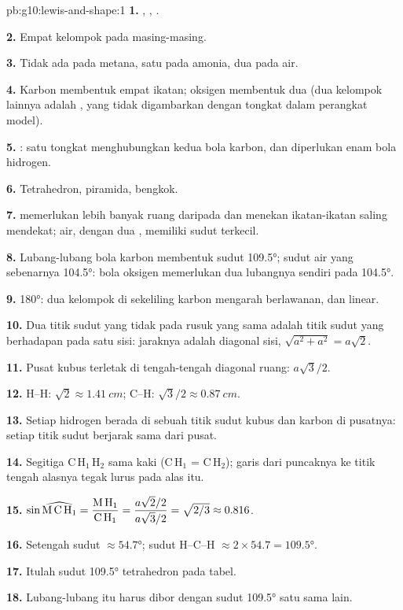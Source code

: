 \begin{solution}{pb:g10:lewis-and-shape:1}
\textbf{1.} , ,
.

\textbf{2.} Empat kelompok pada masing-masing.

\textbf{3.} Tidak ada pada metana, satu pada amonia, dua pada air.

\textbf{4.} Karbon membentuk empat ikatan; oksigen membentuk dua (dua
kelompok lainnya adalah , yang tidak digambarkan dengan
tongkat dalam perangkat model).

\textbf{5.} : satu tongkat
menghubungkan kedua bola karbon, dan diperlukan enam bola hidrogen.

\textbf{6.} Tetrahedron, piramida, bengkok.

\textbf{7.}  memerlukan lebih banyak ruang daripada
 dan menekan ikatan-ikatan saling mendekat; air, dengan
dua , memiliki sudut terkecil.

\textbf{8.} Lubang-lubang bola karbon membentuk sudut \ang{109.5}; sudut
air yang sebenarnya \ang{104.5}: bola oksigen memerlukan dua lubangnya
sendiri pada \ang{104.5}.

\textbf{9.} \ang{180}: dua kelompok di sekeliling karbon mengarah
berlawanan, dan  linear.

\textbf{10.} Dua titik sudut yang tidak pada rusuk yang sama adalah titik
sudut yang berhadapan pada satu sisi: jaraknya adalah diagonal sisi,
$\sqrt{a^2 + a^2} = a\sqrt{2}$.

\textbf{11.} Pusat kubus terletak di tengah-tengah diagonal ruang:
$a\sqrt{3}/2$.

\textbf{12.} H--H: $\sqrt{2} \approx \qty{1.41}{cm}$; C--H:
$\sqrt{3}/2 \approx \qty{0.87}{cm}$.

\textbf{13.} Setiap hidrogen berada di sebuah titik sudut kubus dan
karbon di pusatnya: setiap titik sudut berjarak sama dari pusat.

\textbf{14.} Segitiga C\,H$_1$\,H$_2$ sama kaki (C\,H$_1$ = C\,H$_2$);
garis dari puncaknya ke titik tengah alasnya tegak lurus pada alas itu.

\textbf{15.} $\sin \widehat{\text{M\,C\,H}_1} = \dfrac{\text{M\,H}_1}{\text{C\,H}_1}
= \dfrac{a\sqrt{2}/2}{a\sqrt{3}/2} = \sqrt{2/3} \approx 0.816$.

\textbf{16.} Setengah sudut $\approx \ang{54.7}$; sudut H--C--H $\approx
2 \times 54.7 = \ang{109.5}$.

\textbf{17.} Itulah sudut \ang{109.5} tetrahedron pada tabel.

\textbf{18.} Lubang-lubang itu harus dibor dengan sudut \ang{109.5} satu
sama lain.
\end{solution}
